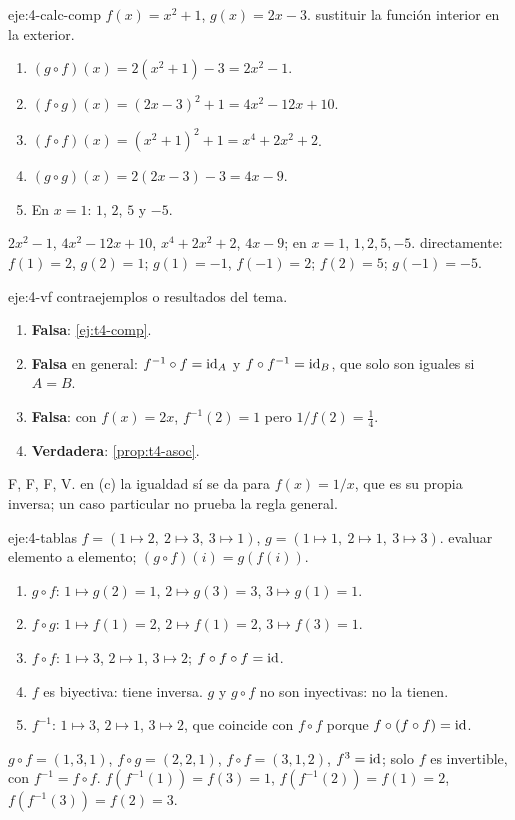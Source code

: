 \begin{solucion}{eje:4-calc-comp}
\datos $f(x)=x^{2}+1$, $g(x)=2x-3$.
\planteamiento sustituir la función interior en la exterior.
\pasos
\begin{enumerate}[label=\arabic*.]
  \item $(g\circ f)(x)=2(x^{2}+1)-3=2x^{2}-1$.
  \item $(f\circ g)(x)=(2x-3)^{2}+1=4x^{2}-12x+10$.
  \item $(f\circ f)(x)=(x^{2}+1)^{2}+1=x^{4}+2x^{2}+2$.
  \item $(g\circ g)(x)=2(2x-3)-3=4x-9$.
  \item En $x=1$: $1$, $2$, $5$ y $-5$.
\end{enumerate}
\resultado $2x^{2}-1$, $4x^{2}-12x+10$, $x^{4}+2x^{2}+2$, $4x-9$; en $x=1$, $1,2,5,-5$.
\comprobacion directamente: $f(1)=2$, $g(2)=1$; $g(1)=-1$, $f(-1)=2$; $f(2)=5$; $g(-1)=-5$.
\end{solucion}

\begin{solucion}{eje:4-vf}
\planteamiento contraejemplos o resultados del tema.
\pasos
\begin{enumerate}[label=(\alph*)]
  \item \textbf{Falsa}: \cref{ej:t4-comp}.
  \item \textbf{Falsa} en general: $f^{-1}\circ f=\mathrm{id}_A$ y $f\circ f^{-1}=\mathrm{id}_B$, que solo son iguales si $A=B$.
  \item \textbf{Falsa}: con $f(x)=2x$, $f^{-1}(2)=1$ pero $1/f(2)=\tfrac14$.
  \item \textbf{Verdadera}: \cref{prop:t4-asoc}.
\end{enumerate}
\resultado F, F, F, V.
\comprobacion en (c) la igualdad sí se da para $f(x)=1/x$, que es su propia inversa; un caso particular no prueba la regla general.
\end{solucion}

\begin{solucion}{eje:4-tablas}
\datos $f=(1\mapsto2,\ 2\mapsto3,\ 3\mapsto1)$, $g=(1\mapsto1,\ 2\mapsto1,\ 3\mapsto3)$.
\planteamiento evaluar elemento a elemento; $(g\circ f)(i)=g(f(i))$.
\pasos
\begin{enumerate}[label=\arabic*.]
  \item $g\circ f$: $1\mapsto g(2)=1$, $2\mapsto g(3)=3$, $3\mapsto g(1)=1$.
  \item $f\circ g$: $1\mapsto f(1)=2$, $2\mapsto f(1)=2$, $3\mapsto f(3)=1$.
  \item $f\circ f$: $1\mapsto3$, $2\mapsto1$, $3\mapsto2$; $f\circ f\circ f=\mathrm{id}$.
  \item $f$ es biyectiva: tiene inversa. $g$ y $g\circ f$ no son inyectivas: no la tienen.
  \item $f^{-1}$: $1\mapsto3$, $2\mapsto1$, $3\mapsto2$, que coincide con $f\circ f$ porque $f\circ(f\circ f)=\mathrm{id}$.
\end{enumerate}
\resultado $g\circ f=(1,3,1)$, $f\circ g=(2,2,1)$, $f\circ f=(3,1,2)$, $f^{3}=\mathrm{id}$; solo $f$ es invertible, con $f^{-1}=f\circ f$.
\comprobacion $f(f^{-1}(1))=f(3)=1$, $f(f^{-1}(2))=f(1)=2$, $f(f^{-1}(3))=f(2)=3$.
\end{solucion}

